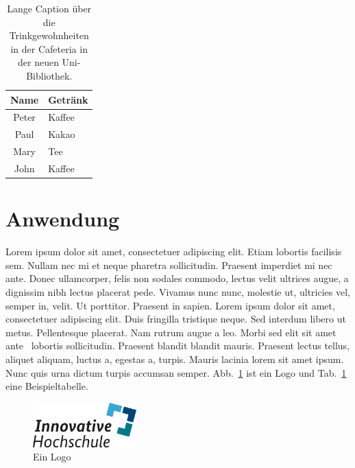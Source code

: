 \documentclass[footmark=none]{tubaf-thesis}
\begin{document}
    \begin{table}[b]
        \centering
        \caption[Trinkgewohnheiten in der Cafeteria]{Lange Caption über die Trinkgewohnheiten in der Cafeteria in der neuen Uni-Bibliothek.}
        \label{tab:Kaffee}
        \begin{tabular}{cl}
            \toprule
            Name & Getränk \\
            \midrule
            Peter & Kaffee \\
            Paul & Kakao \\
            Mary & Tee \\
            John & Kaffee \\
            \bottomrule
        \end{tabular}
    \end{table}
    
    
    \section{Anwendung}
    Lorem ipsum dolor sit amet, consectetuer adipiscing elit. Etiam lobortis facilisis sem.
    Nullam nec mi et neque pharetra sollicitudin. Praesent imperdiet mi nec ante. Donec
    ullamcorper, felis non sodales commodo, lectus velit ultrices augue, a dignissim nibh
    lectus placerat pede. Vivamus nunc nunc, molestie ut, ultricies vel, semper in, velit. Ut
    porttitor. Praesent in sapien. Lorem ipsum dolor sit amet, consectetuer adipiscing elit.
    Duis fringilla tristique neque. Sed interdum libero ut metus. Pellentesque placerat. Nam
    rutrum augue a leo. Morbi sed elit sit amet ante~\cite{Losch2023} lobortis sollicitudin. Praesent blandit
    blandit mauris. Praesent lectus tellus, aliquet aliquam, luctus a, egestas a, turpis. Mauris
    lacinia lorem sit amet ipsum. Nunc quis urna dictum turpis accumsan semper.
    Abb.~\ref{fig:1} ist ein Logo und Tab.~\ref{tab:Kaffee} eine Beispieltabelle.
    


    \begin{figure}[t]
        \centering
        \includegraphics[width=4cm]{innovative-hochschule.png}
        \caption{Ein Logo}
        \label{fig:1}
    \end{figure}


    \printbibliography[heading=bibintoc,title=Literaturverzeichnis]
\end{document}
